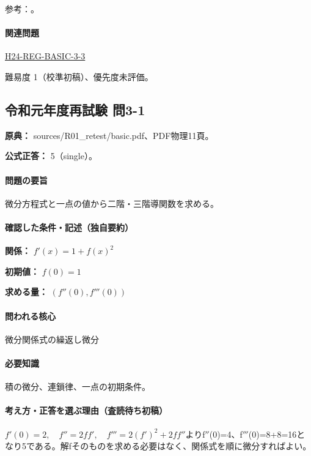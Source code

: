 \par 参考：\cite{mit_chain2007}。

\paragraph{関連問題} \hyperref[q:h24-reg-basic-3-3]{H24-REG-BASIC-3-3}

\par 難易度 1（校準初稿）、優先度未評価。

\subsection{令和元年度再試験 問3-1}
\label{q:r01-ret-basic-3-1}

\noindent\textbf{原典：} sources/R01\_retest/basic.pdf、PDF物理11頁。

\textbf{公式正答：} 5（single）。

\paragraph{問題の要旨} 微分方程式と一点の値から二階・三階導関数を求める。

\paragraph{確認した条件・記述（独自要約）}\mbox{}\par

\noindent\textbf{関係：} \(f'(x)=1+f(x)^2\)\par

\noindent\textbf{初期値：} \(f(0)=1\)\par

\noindent\textbf{求める量：} \((f''(0),f'''(0))\)\par

\paragraph{問われる核心} 微分関係式の繰返し微分

\paragraph{必要知識} 積の微分、連鎖律、一点の初期条件。

\paragraph{考え方・正答を選ぶ理由（査読待ち初稿）} \(f'(0)=2,\quad f''=2ff',\quad f'''=2(f')^2+2ff''\)よりf\ensuremath{''}(0)=\allowbreak{}4、f\ensuremath{'''}(0)=\allowbreak{}8+8=\allowbreak{}16となり5である。解fそのものを求める必要はなく、関係式を順に微分すればよい。


